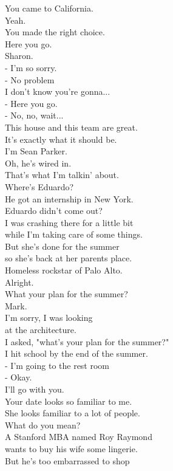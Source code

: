 \documentclass{article}
\begin{document}
\begin{multicols}{3}
You came to California.\\
Yeah.\\
You made the right choice.\\
Here you go.\\
Sharon.\\
- I'm so sorry.\\
- No problem\\
I don't know you're gonna...\\
- Here you go.\\
- No, no, wait...\\
This house and this team are great.\\
It's exactly what it should be.\\
I'm Sean Parker.\\
Oh, he's wired in.\\
That's what I'm talkin' about.\\
Where's Eduardo?\\
He got an internship in New York.\\
Eduardo didn't come out?\\
I was crashing there for a little bit\\
while I'm taking care of some things.\\
But she's done for the summer\\
so she's back at her parents place.\\
Homeless rockstar of Palo Alto.\\
Alright.\\
What your plan for the summer?\\
Mark.\\
I'm sorry, I was looking\\
at the architecture.\\
I asked, "what's your plan for the summer?"\\
I hit school by the end of the summer.\\
- I'm going to the rest room\\
- Okay.\\
I'll go with you.\\
Your date looks so familiar to me.\\
She looks familiar to a lot of people.\\
What do you mean?\\
A Stanford MBA named Roy Raymond\\
wants to buy his wife some lingerie.\\
But he's too embarrassed to shop\\

\end{multicols}
\end{document}
